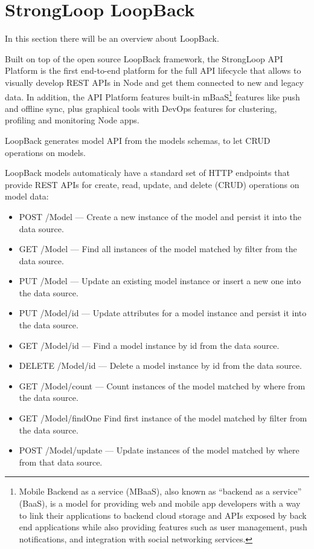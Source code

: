 \section{StrongLoop LoopBack}
\label{sec:TCH_loopback}

In this section there will be an overview about LoopBack.

Built on top of the open source LoopBack framework, the StrongLoop API Platform is the first end-to-end platform for the full API lifecycle that allows to visually develop REST APIs in Node and get them connected to new and legacy data. In addition, the API Platform features built-in mBaaS\footnote{Mobile Backend as a service (MBaaS), also known as ``backend as a service'' (BaaS), is a model for providing web and mobile app developers with a way to link their applications to backend cloud storage and APIs exposed by back end applications while also providing features such as user management, push notifications, and integration with social networking services.} features like push and offline sync, plus graphical tools with DevOps features for clustering, profiling and monitoring Node apps.

LoopBack generates model API from the models schemas, to let CRUD operations on models.

LoopBack models automaticaly have a standard set of HTTP endpoints that provide REST APIs for create, read, update, and delete (CRUD) operations on model data:
\begin{itemize}
\item POST /Model — Create a new instance of the model and persist it into the data source.
\item GET /Model — Find all instances of the model matched by filter from the data source.
\item PUT /Model — Update an existing model instance or insert a new one into the data source.
\item PUT /Model/{id} — Update attributes for a model instance and persist it into the data source.
\item GET /Model/{id} — Find a model instance by id from the data source.
\item DELETE /Model/{id} — Delete a model instance by id from the data source.
\item GET /Model/count — Count instances of the model matched by where from the data source.
\item GET /Model/findOne Find first instance of the model matched by filter from the data source.
\item POST /Model/update — Update instances of the model matched by where from that data source.
\end{itemize}


